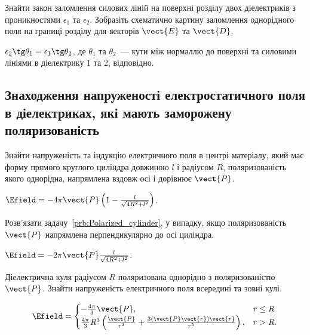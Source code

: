 \begin{problem}
	Знайти закон заломлення силових ліній на поверхні розділу двох діелектриків з проникностями $\epsilon_1$ та $\epsilon_2$. Зобразіть схематично картину заломлення однорідного поля на границі розділу для векторів $\vect{E}$ та $\vect{D}$.
	\begin{solution}
		$\epsilon_2 \tg\theta_1 = \epsilon_1 \tg\theta_2$, де $\theta_1$ та $\theta_2$~--- кути між нормаллю до поверхні та силовими лініями в діелектрику $1$ та $2$, відповідно.
	\end{solution}
\end{problem}


\subsection*{Знаходження напруженості електростатичного поля в діелектриках, які мають заморожену поляризованість}

\begin{problem}\label{prb:Polarized_cylinder}
Знайти напруженість та індукцію електричного поля в центрі матеріалу, який має форму прямого круглого циліндра довжиною $l$ і радіусом $R$, поляризованість якого однорідна, напрямлена вздовж осі і дорівнює $ \vect{P} $.
\begin{solution}
	$\Efield = -4\pi \vect{P} \left( 1 - \frac{l}{\sqrt{4R^2 + l^2}}\right)$.
\end{solution}
\end{problem}

\begin{problem}
Розв'язати задачу~\ref{prb:Polarized_cylinder}, у випадку, якщо поляризованість $ \vect{P} $ напрямлена перпендикулярно до осі циліндра.
\begin{solution}
	$\Efield = -2\pi \vect{P} \frac{l}{\sqrt{4R^2 + l^2}}$.
\end{solution}
\end{problem}

\begin{problem}\label{prb:Field_of_Dielectric_Sphere}
Діелектрична куля радіусом $R$ поляризована однорідно з поляризованістю~$\vect{P}$. Знайти напруженість електричного поля всередині та зовні кулі.
\begin{solution}
	\[
	\Efield =
	\begin{cases}
	- \frac{4\pi}{3}\vect{P},                                                                                   & r \le R \\
	\frac{4\pi}{3}R^3\left( \frac{\vect{P}}{r^3} + \frac{3\left(\vect{P}\vect{r}\right)\vect{r} }{r^5}\right) , & r > R.
	\end{cases}
	\]
\end{solution}
\end{problem}

